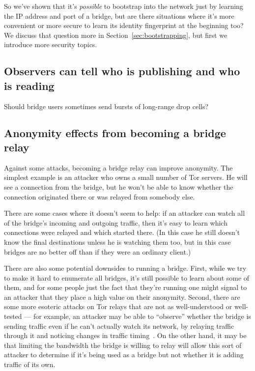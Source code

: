 \documentclass{llncs}
\begin{document}
So we've shown that it's \emph{possible} to bootstrap into the network
just by learning the IP address and port of a bridge, but are there
situations where it's more convenient or more secure to learn its
identity fingerprint at the beginning too? We discuss that question
more in Section~\ref{sec:bootstrapping}, but first we introduce more
security topics.

\subsection{Observers can tell who is publishing and who is reading}
\label{subsec:upload-padding}

Should bridge users sometimes send bursts of long-range drop cells?

\subsection{Anonymity effects from becoming a bridge relay}

Against some attacks, becoming a bridge relay can improve anonymity. The
simplest example is an attacker who owns a small number of Tor servers. He
will see a connection from the bridge, but he won't be able to know
whether the connection originated there or was relayed from somebody else.

There are some cases where it doesn't seem to help: if an attacker can
watch all of the bridge's incoming and outgoing traffic, then it's easy
to learn which connections were relayed and which started there. (In this
case he still doesn't know the final destinations unless he is watching
them too, but in this case bridges are no better off than if they were
an ordinary client.)

There are also some potential downsides to running a bridge. First, while
we try to make it hard to enumerate all bridges, it's still possible to
learn about some of them, and for some people just the fact that they're
running one might signal to an attacker that they place a high value
on their anonymity. Second, there are some more esoteric attacks on Tor
relays that are not as well-understood or well-tested --- for example, an
attacker may be able to ``observe'' whether the bridge is sending traffic
even if he can't actually watch its network, by relaying traffic through
it and noticing changes in traffic timing~\cite{attack-tor-oak05}. On
the other hand, it may be that limiting the bandwidth the bridge is
willing to relay will allow this sort of attacker to determine if it's
being used as a bridge but not whether it is adding traffic of its own.
\end{document}
